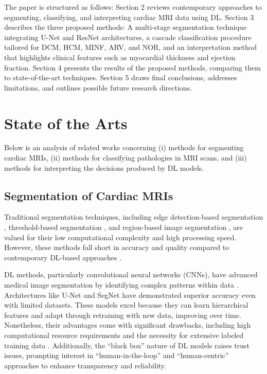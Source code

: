 \documentclass[fleqn,10pt]{wlscirep}
\begin{document}
The paper is structured as follows: Section 2 reviews contemporary approaches to segmenting, classifying, and interpreting cardiac MRI data using DL. Section 3 describes the three proposed methods: A multi-stage segmentation technique integrating U-Net and ResNet architectures, a cascade classification procedure tailored for DCM, HCM, MINF, ARV, and NOR, and an interpretation method that highlights clinical features such as myocardial thickness and ejection fraction. Section 4 presents the results of the proposed methods, comparing them to state-of-the-art techniques. Section 5 draws final conclusions, addresses limitations, and outlines possible future research directions.

\section*{State of the Arts}

Below is an analysis of related works concerning (i) methods for segmenting cardiac MRIs, (ii) methods for classifying pathologies in MRI scans, and (iii) methods for interpreting the decisions produced by DL models.

\subsection*{Segmentation of Cardiac MRIs}

Traditional segmentation techniques, including edge detection-based segmentation \cite{Zhao:2005}, threshold-based segmentation \cite{Xu:2010}, and region-based image segmentation \cite{Cigla:2008}, are valued for their low computational complexity and high processing speed. However, these methods fall short in accuracy and quality compared to contemporary DL-based approaches \cite{Liu:2021}.

DL methods, particularly convolutional neural networks (CNNs), have advanced medical image segmentation by identifying complex patterns within data \cite{Berezsky:2024}. Architectures like U-Net \cite{Ronneberger:2015} and SegNet \cite{Badrinarayanan:2017} have demonstrated superior accuracy even with limited datasets. These models excel because they can learn hierarchical features and adapt through retraining with new data, improving over time. Nonetheless, their advantages come with significant drawbacks, including high computational resource requirements and the necessity for extensive labeled training data \cite{Ankenbrand:2021}. Additionally, the ``black box'' nature of DL models raises trust issues, prompting interest in ``human-in-the-loop'' \cite{Radiuk:2022} and ``human-centric'' \cite{Singh:2025} approaches to enhance transparency and reliability.
\end{document}
